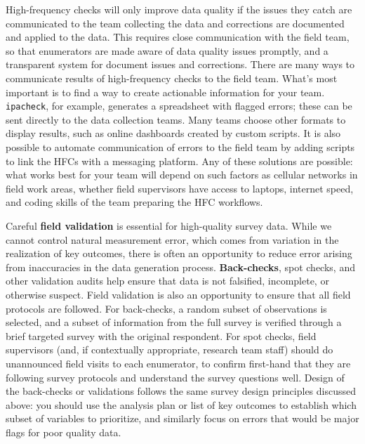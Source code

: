 High-frequency checks will only improve data quality
if the issues they catch are communicated to the team collecting the data
and corrections are documented and applied to the data.
This requires close communication with the field team,
so that enumerators are made aware of data quality issues promptly,
and a transparent system for document issues and corrections.
There are many ways to communicate results of high-frequency checks to the field team.
What's most important is to find a way to create actionable information for your team.
\texttt{ipacheck},
for example, generates a spreadsheet with flagged errors;
these can be sent directly to the data collection teams.
Many teams choose other formats to display results,
such as online dashboards created by custom scripts.
It is also possible to automate communication of errors to the field team
by adding scripts to link the HFCs with a messaging platform.
Any of these solutions are possible:
what works best for your team will depend on such factors as
cellular networks in field work areas, whether field supervisors have access to laptops,
internet speed, and coding skills of the team preparing the HFC workflows.

Careful \textbf{field validation} is essential for high-quality survey data.
While we cannot control natural measurement error,
which comes from variation in the realization of key outcomes,
there is often an opportunity to reduce error arising from inaccuracies in the data generation process.
\textbf{Back-checks}, spot checks, and other validation audits help ensure that
data is not falsified, incomplete, or otherwise suspect.
Field validation is also an opportunity to ensure that all field protocols are followed.
For back-checks, a random subset of observations is selected,
and a subset of information from the full survey is
verified through a brief targeted survey with the original respondent.
For spot checks, field supervisors (and, if contextually appropriate, research team staff)
should do unannounced field visits to each enumerator,
to confirm first-hand that they are following survey protocols and
understand the survey questions well.
Design of the back-checks or validations follows the same survey design
principles discussed above: you should use the analysis plan
or list of key outcomes to establish which subset of variables to prioritize,
and similarly focus on errors that would be major flags for poor quality data.

